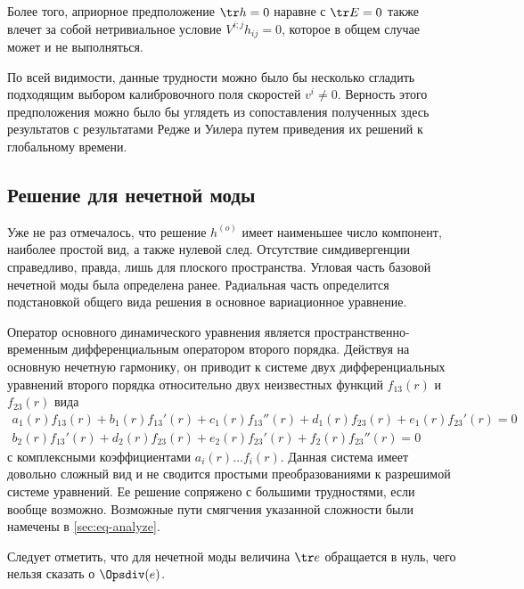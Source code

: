 \documentclass[\docroot/reports/draft/report.tex]{subfiles}
\begin{document}
    Более того, априорное предположение $\tr h = 0$ наравне с $\tr E = 0$ также влечет за собой нетривиальное условие $V^{i;j} h_{ij} = 0$, которое в общем случае может и не выполняться.

    По всей видимости, данные трудности можно было бы несколько сгладить подходящим выбором калибровочного поля скоростей $v^i \neq 0$. Верность этого предположения можно было бы углядеть из сопоставления полученных здесь результатов с результатами Редже и Уилера \cite{regge_wheeler_1957} путем приведения их решений к глобальному времени.

\subsection{Решение для нечетной моды}

    Уже не раз отмечалось, что решение $h^{(o)}$ имеет наименьшее число компонент, наиболее простой вид, а также нулевой след. Отсутствие симдивергенции справедливо, правда, лишь для плоского пространства. Угловая часть базовой нечетной моды была определена ранее. Радиальная часть определится подстановкой общего вида решения в основное вариационное уравнение.

    Оператор основного динамического уравнения является пространственно-временным дифференциальным оператором второго порядка. Действуя на основную нечетную гармонику, он приводит к системе двух дифференциальных уравнений второго порядка относительно двух неизвестных функций $f_{13}(r)$ и $f_{23}(r)$ вида
    \begin{equation*}\begin{aligned}
        a_1(r) f_{13}(r) + b_1(r) f_{13}'(r) + c_1(r) f_{13}''(r) +
        d_1(r) f_{23}(r) + e_1(r) f_{23}'(r) = 0 \\
        b_2(r) f_{13}'(r) + d_2(r) f_{23}(r) +
        e_2(r) f_{23}'(r) + f_2(r) f_{23}''(r) = 0
    \end{aligned}\end{equation*}
    с комплексными коэффициентами $a_i(r) \dots f_i(r)$. Данная система имеет довольно сложный вид и не сводится простыми преобразованиями к разрешимой системе уравнений. Ее решение сопряжено с большими трудностями, если вообще возможно. Возможные пути смягчения указанной сложности были намечены в \autoref{sec:eq-analyze}.

    Следует отметить, что для нечетной моды величина $\tr e$ обращается в нуль, чего нельзя сказать о $\Opsdiv(e)$.
\end{document}
